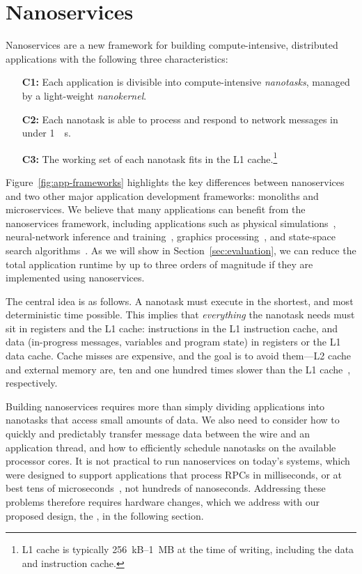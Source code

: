 \section{Nanoservices}
\label{sec:nanoservices}
Nanoservices are a new framework for building compute-intensive, distributed applications with the following three characteristics:

\vspace{0.5pt}
\begin{itemize}[topsep=0.4\baselineskip, leftmargin=20pt]
    \item[\bf C1:] Each application is divisible into compute-intensive {\em nanotasks}, managed by a light-weight {\em nanokernel}.
    \item[\bf C2:] Each nanotask is able to process and respond to network messages in under \SI{1}{\mu s}.
    \item[\bf C3:] The working set of each nanotask fits in the L1 cache.\footnote{L1 cache is typically \SI{256}{kB}--\SI{1}{MB} at the time of writing, including the data and instruction cache.}
\end{itemize}
\vspace{0.5pt}

Figure~\ref{fig:app-frameworks} highlights the key differences between nanoservices and two other major application development frameworks: monoliths and microservices.
We believe that many applications can benefit from the nanoservices framework, including applications such as physical simulations~\cite{barnes-hut, molecular-dynamics}, neural-network inference and training~\cite{tensorflow}, graphics processing~\cite{ray-tracing}, and state-space search algorithms~\cite{state-space-search}.
As we will show in Section~\ref{sec:evaluation}, we can reduce the total application runtime by up to three orders of magnitude if they are implemented using nanoservices.

The central idea is as follows. A nanotask must execute in the shortest, and most deterministic time possible. 
This implies that {\em everything} the nanotask needs must sit in registers and the L1 cache: instructions in the L1 instruction cache, and data (in-progress messages, variables and program state) in registers or the L1 data cache. 
Cache misses are expensive, and the goal is to avoid them---L2 cache and external memory are, ten and one hundred times slower than the L1 cache~\cite{jeff-dean-numbers}, respectively.

Building nanoservices requires more than simply dividing applications into nanotasks that access small amounts of data.
We also need to consider how to quickly and predictably transfer message data between the wire and an application thread, and how to efficiently schedule nanotasks on the available processor cores.
It is not practical to run nanoservices on today's systems, which were designed to support applications that process RPCs in milliseconds, or at best tens of microseconds~\cite{eRPC, perfkit-grpc}, not hundreds of nanoseconds.
Addressing these problems therefore requires hardware changes, which we address with our proposed design, the \name{}, in the following section.

